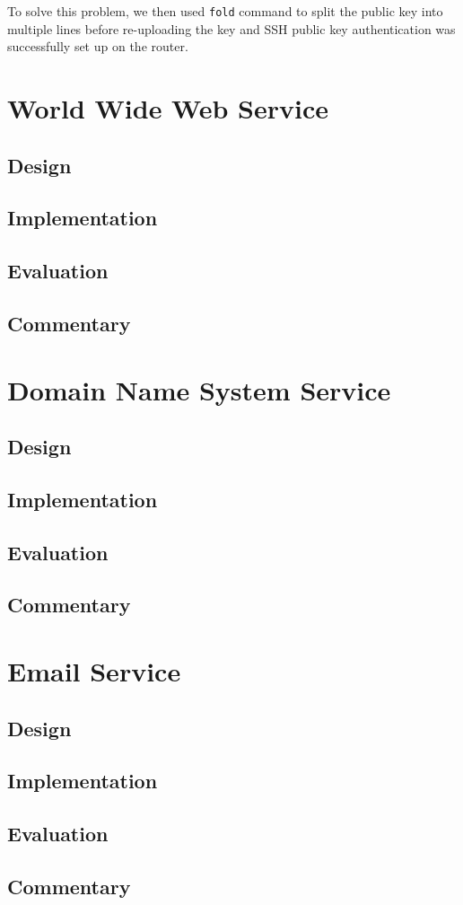 To solve this problem, we then used \texttt{fold} command to split the public key into multiple lines before re-uploading the key and SSH public key authentication was successfully set up on the router.


\section{World Wide Web Service}

\subsection{Design}

\subsection{Implementation}

\subsection{Evaluation}

\subsection{Commentary}



\section{Domain Name System Service}

\subsection{Design}

\subsection{Implementation}

\subsection{Evaluation}

\subsection{Commentary}


\section{Email Service}

\subsection{Design}

\subsection{Implementation}

\subsection{Evaluation}

\subsection{Commentary}
